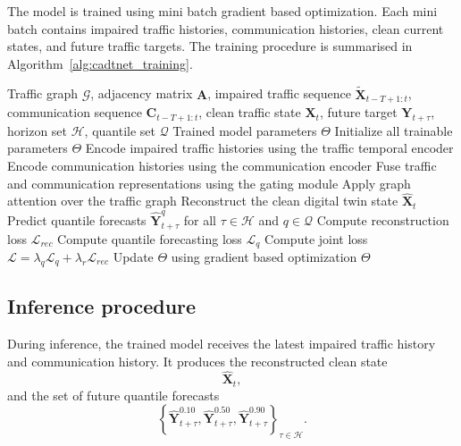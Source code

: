 \documentclass[pdflatex,sn-mathphys-num]{sn-jnl}%
\theoremstyle{thmstyleone}%
\theoremstyle{thmstyletwo}%
\theoremstyle{thmstylethree}%
\begin{document}
The model is trained using mini batch gradient based optimization. Each mini batch contains impaired traffic histories, communication histories, clean current states, and future traffic targets. The training procedure is summarised in Algorithm~\ref{alg:cadtnet_training}.

\begin{algorithm}[htbp]
\caption{Training procedure of CA-DTNet}
\label{alg:cadtnet_training}
\begin{algorithmic}[1]
\Require Traffic graph \(\mathcal{G}\), adjacency matrix \(\mathbf{A}\), impaired traffic sequence \(\widetilde{\mathbf{X}}_{t-T+1:t}\), communication sequence \(\mathbf{C}_{t-T+1:t}\), clean traffic state \(\mathbf{X}_{t}\), future target \(\mathbf{Y}_{t+\tau}\), horizon set \(\mathcal{H}\), quantile set \(\mathcal{Q}\)
\Ensure Trained model parameters \(\Theta\)
\State Initialize all trainable parameters \(\Theta\)
        \State Encode impaired traffic histories using the traffic temporal encoder
        \State Encode communication histories using the communication encoder
        \State Fuse traffic and communication representations using the gating module
        \State Apply graph attention over the traffic graph
        \State Reconstruct the clean digital twin state \(\widehat{\mathbf{X}}_{t}\)
        \State Predict quantile forecasts \(\widehat{\mathbf{Y}}_{t+\tau}^{q}\) for all \(\tau\in\mathcal{H}\) and \(q\in\mathcal{Q}\)
        \State Compute reconstruction loss \(\mathcal{L}_{rec}\)
        \State Compute quantile forecasting loss \(\mathcal{L}_{q}\)
        \State Compute joint loss \(\mathcal{L}=\lambda_{q}\mathcal{L}_{q}+\lambda_{r}\mathcal{L}_{rec}\)
        \State Update \(\Theta\) using gradient based optimization
    \EndFor
\EndFor
\State \Return \(\Theta\)
\end{algorithmic}
\end{algorithm}

\subsection{Inference procedure}
\label{subsec:inference_procedure}

During inference, the trained model receives the latest impaired traffic history and communication history. It produces the reconstructed clean state
\begin{equation}
    \widehat{\mathbf{X}}_{t},
\end{equation}
and the set of future quantile forecasts
\begin{equation}
    \left\{
    \widehat{\mathbf{Y}}_{t+\tau}^{0.10},
    \widehat{\mathbf{Y}}_{t+\tau}^{0.50},
    \widehat{\mathbf{Y}}_{t+\tau}^{0.90}
    \right\}_{\tau\in\mathcal{H}}.
\end{equation}
\end{document}
